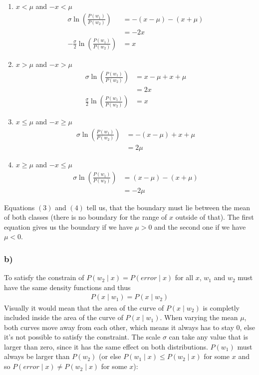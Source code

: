 \documentclass[10pt,a4paper]{article}
\begin{document}
\begin{enumerate}
	\item $x < \mu$ and $-x < \mu$ \\
		\begin{align*}
			\sigma\ln\left(\frac{P(w_1)}{P(w_2)}\right) &= -(x - \mu) - (x + \mu ) \\
			&= -2x \\
			- \frac{\sigma}{2}\ln\left(\frac{P(w_1)}{P(w_2)}\right) &= x
		\end{align*}
	\item $x > \mu$ and $-x > \mu$ \\
		\begin{align*}
			\sigma\ln\left(\frac{P(w_1)}{P(w_2)}\right) &= x - \mu + x + \mu \\
			&= 2x \\
			\frac{\sigma}{2}\ln\left(\frac{P(w_1)}{P(w_2)}\right) &= x
		\end{align*}		
		
	\item $x \le \mu$ and $-x \geq \mu$ \\
		\begin{align*}
			\sigma\ln\left(\frac{P(w_1)}{P(w_2)}\right) &= -(x - \mu) + x + \mu \\
			&= 2\mu
		\end{align*}
	\item $x \geq \mu$ and $-x \le \mu$ \\
		\begin{align*}
			\sigma\ln\left(\frac{P(w_1)}{P(w_2)}\right) &= (x - \mu) - (x + \mu ) \\
			&= -2\mu
		\end{align*}
\end{enumerate}

Equations $(3)$ and $(4)$ tell us, that the boundary must lie between the mean of both classes (there is no boundary for the range of $x$ outside of that). The first equation gives us the boundary if we have $\mu > 0$ and the second one if we have $\mu < 0$.

\subsubsection*{b)}
To satisfy the constrain of $P(w_2 \mid x) = P(error \mid x)$ for all $x$, $w_1$ and $w_2$ must have the same density functions and thus
\begin{align*}
    P(x \mid w_1) = P(x \mid w_2)
\end{align*}
Visually it would mean that the area of the curve of $P(x \mid w_2)$ is completly included inside the area of the curve of $P(x \mid w_1)$.
When varying the mean $\mu$, both curves move away from each other, which means it always has to stay 0, else it's not possible to satisfy the constraint. The scale $\sigma$ can take any value that is larger than zero, since it has the same effect on both distributions. $P(w_1)$ must always be larger than $P(w_2)$ (or else $P(w_1 \mid x) \le P(w_2 \mid x)$ for some $x$ and so $P(error \mid x) \not = P(w_2 \mid x)$ for some $x$):
\end{document}
